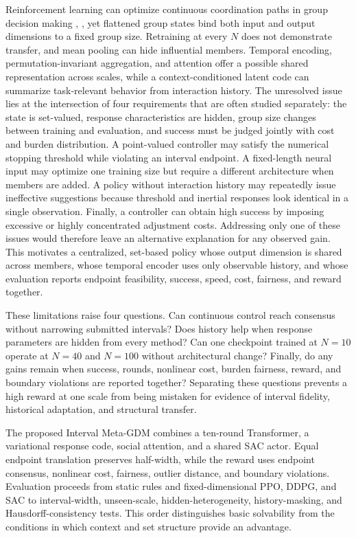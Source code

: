 \documentclass[journal]{IEEEtran}
\begin{document}
Reinforcement learning can optimize continuous coordination paths in group decision making \cite{ref14}, \cite{ref15}, yet flattened group states bind both input and output dimensions to a fixed group size. Retraining at every $N$ does not demonstrate transfer, and mean pooling can hide influential members. Temporal encoding, permutation-invariant aggregation, and attention offer a possible shared representation across scales, while a context-conditioned latent code can summarize task-relevant behavior from interaction history. The unresolved issue lies at the intersection of four requirements that are often studied separately: the state is set-valued, response characteristics are hidden, group size changes between training and evaluation, and success must be judged jointly with cost and burden distribution. A point-valued controller may satisfy the numerical stopping threshold while violating an interval endpoint. A fixed-length neural input may optimize one training size but require a different architecture when members are added. A policy without interaction history may repeatedly issue ineffective suggestions because threshold and inertial responses look identical in a single observation. Finally, a controller can obtain high success by imposing excessive or highly concentrated adjustment costs. Addressing only one of these issues would therefore leave an alternative explanation for any observed gain. This motivates a centralized, set-based policy whose output dimension is shared across members, whose temporal encoder uses only observable history, and whose evaluation reports endpoint feasibility, success, speed, cost, fairness, and reward together.

These limitations raise four questions. Can continuous control reach consensus without narrowing submitted intervals? Does history help when response parameters are hidden from every method? Can one checkpoint trained at $N=10$ operate at $N=40$ and $N=100$ without architectural change? Finally, do any gains remain when success, rounds, nonlinear cost, burden fairness, reward, and boundary violations are reported together? Separating these questions prevents a high reward at one scale from being mistaken for evidence of interval fidelity, historical adaptation, and structural transfer.

The proposed Interval Meta-GDM combines a ten-round Transformer, a variational response code, social attention, and a shared SAC actor. Equal endpoint translation preserves half-width, while the reward uses endpoint consensus, nonlinear cost, fairness, outlier distance, and boundary violations. Evaluation proceeds from static rules and fixed-dimensional PPO, DDPG, and SAC to interval-width, unseen-scale, hidden-heterogeneity, history-masking, and Hausdorff-consistency tests. This order distinguishes basic solvability from the conditions in which context and set structure provide an advantage.
\end{document}
